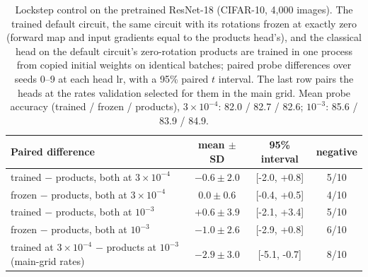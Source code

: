 \begin{table}[h]
\centering
\caption{Lockstep control on the pretrained ResNet-18 (CIFAR-10, 4,000 images). The trained
default circuit, the same circuit with its rotations frozen at exactly zero (forward map and
input gradients equal to the products head's), and the classical head on the default
circuit's zero-rotation products are trained in one process from copied initial weights on
identical batches; paired probe differences over seeds 0--9 at each head lr, with a 95\% paired
$t$ interval. The last row pairs the heads at the rates validation selected for them in the
main grid. Mean probe accuracy (trained / frozen / products), $3\times10^{-4}$: 82.0 / 82.7 / 82.6; $10^{-3}$: 85.6 / 83.9 / 84.9.}
\label{tab:lockstep}
\small
\begin{tabular}{lccc}
\toprule
Paired difference & mean $\pm$ SD & 95\% interval & negative \\
\midrule
trained $-$ products, both at $3\times10^{-4}$ & $-0.6 \pm 2.0$ & [-2.0, +0.8] & 5/10 \\
frozen $-$ products, both at $3\times10^{-4}$ & $0.0 \pm 0.6$ & [-0.4, +0.5] & 4/10 \\
trained $-$ products, both at $10^{-3}$ & $+0.6 \pm 3.9$ & [-2.1, +3.4] & 5/10 \\
frozen $-$ products, both at $10^{-3}$ & $-1.0 \pm 2.6$ & [-2.9, +0.8] & 6/10 \\
\midrule
trained at $3\times10^{-4}$ $-$ products at $10^{-3}$ (main-grid rates) & $-2.9 \pm 3.0$ & [-5.1, -0.7] & 8/10 \\
\bottomrule
\end{tabular}
\end{table}
